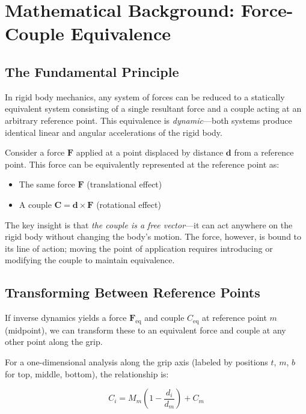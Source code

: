 \documentclass[11pt,a4paper]{article}
\newcommand{\bvec}[1]{\mathbf{#1}}
\newcommand{\Feq}{\bvec{F}_{\text{eq}}}
\newcommand{\Ceq}{C_{\text{eq}}}
\begin{document}
\section{Mathematical Background: Force-Couple Equivalence}

\subsection{The Fundamental Principle}

In rigid body mechanics, any system of forces can be reduced to a statically equivalent system consisting of a single resultant force and a couple acting at an arbitrary reference point. This equivalence is \emph{dynamic}—both systems produce identical linear and angular accelerations of the rigid body.

Consider a force $\bvec{F}$ applied at a point displaced by distance $\bvec{d}$ from a reference point. This force can be equivalently represented at the reference point as:
\begin{itemize}
    \item The same force $\bvec{F}$ (translational effect)
    \item A couple $\bvec{C} = \bvec{d} \times \bvec{F}$ (rotational effect)
\end{itemize}

The key insight is that \emph{the couple is a free vector}—it can act anywhere on the rigid body without changing the body's motion. The force, however, is bound to its line of action; moving the point of application requires introducing or modifying the couple to maintain equivalence.

\subsection{Transforming Between Reference Points}

If inverse dynamics yields a force $\Feq$ and couple $\Ceq$ at reference point $m$ (midpoint), we can transform these to an equivalent force and couple at any other point along the grip. 

For a one-dimensional analysis along the grip axis (labeled by positions $t$, $m$, $b$ for top, middle, bottom), the relationship is:

\begin{equation}
\label{eq:couple_transform}
C_i = M_m \left(1 - \frac{d_i}{d_m}\right) + C_m
\end{equation}
\end{document}
